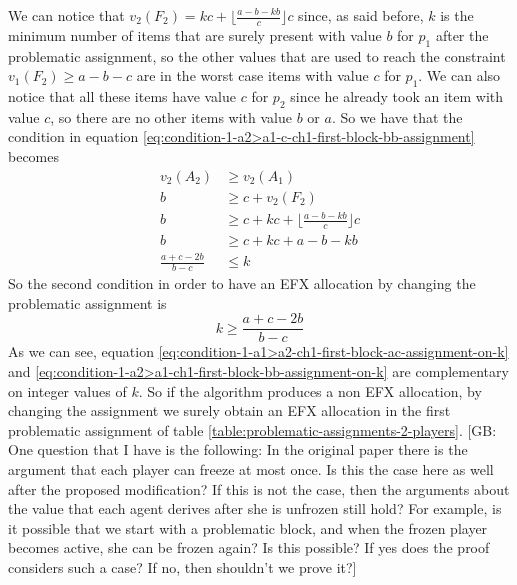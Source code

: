 \documentclass{article}
\newcommand{\gb}[1]{{\color{red}[GB: #1]}}
\begin{document}
We can notice that $v_2(F_2) = kc + \lfloor \frac{a-b-kb}{c} \rfloor c$ since, as said before, $k$ is the minimum number of items that are surely present with value $b$ for $p_1$ after the problematic assignment, so the other values that are used to reach the constraint $v_1(F_2) \ge a-b-c$ are in the worst case items with value $c$ for $p_1$. We can also notice that all these items have value $c$ for $p_2$ since he already took an item with value $c$, so there are no other items with value $b$ or $a$. So we have that the condition in equation \ref{eq:condition-1-a2>a1-c-ch1-first-block-bb-assignment} becomes
\begin{align*}
    v_2(A_2) &\ge v_2(A_1)\\
     b  &\ge  c + v_2(F_2)\\
      b  &\ge  c +  kc + \lfloor \frac{a-b-kb}{c} \rfloor c\\
      b  &\ge  c +  kc + a-b-kb\\
      \frac{a + c -2b}{b-c}  &\le   k
\end{align*}
So the second condition in order to have an EFX allocation by changing the problematic assignment is 
\begin{equation}
    k \ge \frac{a + c -2b}{b-c}
    \label{eq:condition-1-a2>a1-ch1-first-block-bb-assignment-on-k}
\end{equation}
As we can see, equation \ref{eq:condition-1-a1>a2-ch1-first-block-ac-assignment-on-k} and \ref{eq:condition-1-a2>a1-ch1-first-block-bb-assignment-on-k} are complementary on integer values of $k$. So if the algorithm produces a non EFX allocation, by changing the assignment we surely obtain an EFX allocation in the first problematic assignment of table \ref{table:problematic-assignments-2-players}. 
\gb{One question that I have is the following: In the original paper there is the argument that each player can freeze at most once. Is this the case here as well after the proposed modification? If this is not the case, then the arguments about the value that each agent derives after she is unfrozen still hold? For example, is it possible that we start with a problematic block, and when the frozen player becomes active, she can be frozen again? Is this possible? If yes does the proof considers such a case? If no, then shouldn't we prove it?}
\end{document}
